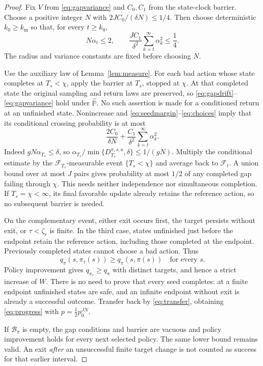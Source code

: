 \begin{proof}
Fix $V$ from \eqref{eq:gapvariance} and $C_0,C_1$ from the state-clock barrier. Choose a positive integer
$N$ with $2JC_0/(\delta N)\le1/4$. Then choose deterministic $k_0\ge k_{\mathrm m}$ so that, for every $t\ge k_0$,
\begin{equation}\label{eq:choices}
N\alpha_t\le2,\qquad\frac{JC_1}{\delta^2}\sum_{k=t}^{\infty}\alpha_k^2\le\frac14.
\end{equation}
The radius and variance constants are fixed before choosing $N$.

Use the auxiliary law of Lemma~\ref{lem:measure}. For each bad action whose state completes at
$T_s<\chi$, apply the barrier at $T_s$, stopped at $\chi$. At that completed state the original sampling
and return laws are preserved, so \eqref{eq:gapdrift}--\eqref{eq:gapvariance} hold under $\widehat{\mathbb P}$. No such assertion is made for
a conditioned return at an unfinished state. Nonincrease and \eqref{eq:seedmargin}--\eqref{eq:choices} imply that its
conditional crossing probability is at most
\begin{equation}\label{eq:crossprob}
\frac{2C_0}{\delta N}+\frac{C_1}{\delta^2}\sum_{k=t}^{\infty}\alpha_k^2.
\end{equation}
Indeed $gN\alpha_{T_s}\le\delta$, so $\alpha_{T_s}/\min\{D_{T_s}^{\pi,s,a},\delta\}\le1/(gN)$. Multiply the conditional estimate by
the $\mathcal F_{T_s}$-measurable event $\{T_s<\chi\}$ and average back to $\mathcal F_t$. A union bound over at most
$J$ pairs gives probability at most $1/2$ of any completed gap failing through $\chi$. This needs
neither independence nor simultaneous completion. If $T_s=\chi<\infty$, its final favorable update
already retains the reference action, so no subsequent barrier is needed.

On the complementary event, either exit occurs first, the target persists without exit,
or $\tau<\zeta_r$ is finite. In the third case, states unfinished just before the endpoint retain the
reference action, including those completed at the endpoint. Previously completed states
cannot choose a bad action. Thus
\[
q_\pi(s,\pi_\tau(s))\ge q_\pi(s,\pi(s))\quad\text{for every }s.
\]
Policy improvement gives $q_{\pi_\tau}\ge q_\pi$ with distinct targets, and hence a strict increase of $W$.
There is no need to prove that every seed completes: at a finite endpoint unfinished states
are safe, and an infinite endpoint without exit is already a successful outcome. Transfer back
by \eqref{eq:transfer}, obtaining \eqref{eq:progress} with $p=\frac12p_0^{JN}$.

If $\mathcal B_\pi$ is empty, the gap conditions and barrier are vacuous and policy improvement
holds for every next selected policy. The same lower bound remains valid. An exit \emph{after} an
unsuccessful finite target change is not counted as success for that earlier interval.
\end{proof}

